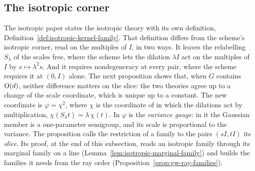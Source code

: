 \subsection{The isotropic corner}

The isotropic paper states the isotropic theory with its own definition,
Definition~\ref{def:isotropic-kernel-family}. That definition differs from the scheme's isotropic
corner, read on the multiples of $I$, in two ways. It leaves the relabelling $S_\lambda$ of the
scales free, where the scheme lets the dilation $\lambda I$ act on the multiples of $I$ by
$s \mapsto \lambda^2 s$. And it requires nondegeneracy at every pair, where the scheme requires it
at $(0, I)$ alone. The next proposition shows that, when $G$ contains $\mathrm{O}(d)$, neither difference
matters on the slice: the two theories
agree up to a change of the scale coordinate, which is unique up to a constant. The new coordinate
is $\varphi = \chi^2$, where $\chi$ is the coordinate of  in which the dilations act
by multiplication, $\chi(S_\lambda t) = \lambda\,\chi(t)$. In  $\varphi$ is the
\emph{variance gauge}: in it the Gaussian member is a one-parameter semigroup, and its scale is
proportional to the variance. The proposition calls the restriction of a family to the pairs
$(sI, tI)$ its \emph{slice}. Its proof, at the end of this subsection, reads an isotropic family
through its marginal family on a line (Lemma~\ref{lem:isotropic-marginal-family}) and builds the
families it needs from the ray order (Proposition~\ref{prop:gw-ray-families}).

